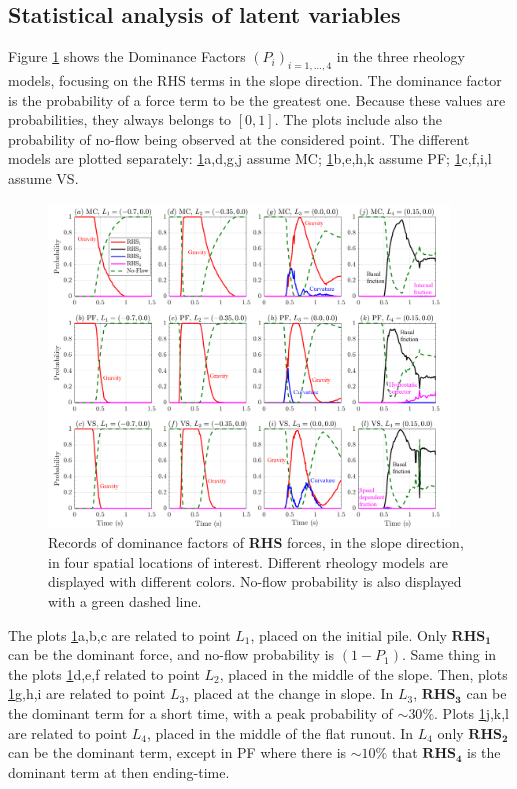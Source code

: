 \documentclass{article}
\begin{document}
\subsection{Statistical analysis of latent variables}\label{Hq1}
Figure \ref{fig:Ramp-Pr_x} shows the Dominance Factors $(P_i)_{i=1,\dots,4}$ in the three rheology models, focusing on the RHS terms in the slope direction. The dominance factor is the probability of a force term to be the greatest one. Because these values are probabilities, they always belongs to $[0,1]$. The plots include also the probability of no-flow being observed at the considered point. The different models are plotted separately: \ref{fig:Ramp-Pr_x}a,d,g,j assume MC; \ref{fig:Ramp-Pr_x}b,e,h,k assume PF; \ref{fig:Ramp-Pr_x}c,f,i,l assume VS. 
\begin{figure}[H]
         \centering
        \includegraphics[width=0.95\textwidth]{InclinedPlane/ForceContrib/Pr_x.png}
        \caption{Records of dominance factors of \textbf{RHS} forces, in the slope direction, in four spatial locations of interest. Different rheology models are displayed with different colors. No-flow probability is also displayed with a green dashed line.}
        \label{fig:Ramp-Pr_x}
\end{figure}
The plots \ref{fig:Ramp-Pr_x}a,b,c are related to point $L_1$, placed on the initial pile. Only $\boldsymbol{RHS_1}$ can be the dominant force, and no-flow probability is $(1-P_1)$. Same thing in the plots \ref{fig:Ramp-Pr_x}d,e,f related to point $L_2$, placed in the middle of the slope. Then, plots \ref{fig:Ramp-Pr_x}g,h,i are related to point $L_3$, placed at the change in slope. In $L_3$, $\boldsymbol{RHS_3}$ can be the dominant term for a short time, with a peak probability of $\sim 30\%$. Plots \ref{fig:Ramp-Pr_x}j,k,l are related to point $L_4$, placed in the middle of the flat runout. In $L_4$ only $\boldsymbol{RHS_2}$ can be the dominant term, except in PF where there is $\sim 10\%$ that $\boldsymbol{RHS_4}$ is the dominant term at then ending-time.
\end{document}
